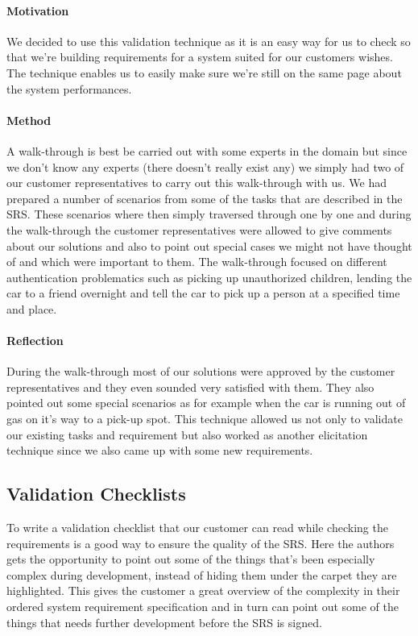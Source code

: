 \documentclass[10pt]{article}
\begin{document}
\paragraph{Motivation}
\hfill \break
We decided to use this validation technique as it is an easy way for us to check so that we're building requirements for a system suited for our customers wishes. The technique enables us to easily make sure we're still on the same page about the system performances.

\paragraph{Method}
\hfill \break
A walk-through is best be carried out with some experts in the domain but since we don't know any experts (there doesn't really exist any) we simply had two of our customer representatives to carry out this walk-through with us.
We had prepared a number of scenarios from some of the tasks that are described in the SRS. These scenarios where then simply traversed through one by one and during the walk-through the customer representatives were allowed to give comments about our solutions and also to point out special cases we might not have thought of and which were important to them.
The walk-through focused on different authentication problematics such as picking up unauthorized children, lending the car to a friend overnight and tell the car to pick up a person at a specified time and place.

\paragraph{Reflection}
\hfill \break
During the walk-through most of our solutions were approved by the customer representatives and they even sounded very satisfied with them.
They also pointed out some special scenarios as for example when the car is running out of gas on it's way to a pick-up spot.
This technique allowed us not only to validate our existing tasks and requirement but also worked as another elicitation technique since we also came up with some new requirements.

\subsection{Validation Checklists}
To write a validation checklist that our customer can read while checking the requirements is a good way to ensure the quality of the SRS. Here the authors gets the opportunity to point out some of the things that's been especially complex during development, instead of hiding them under the carpet they are highlighted. This gives the customer a great overview of the complexity in their ordered system requirement specification and in turn can point out some of the things that needs further development before the SRS is signed.
\end{document}
